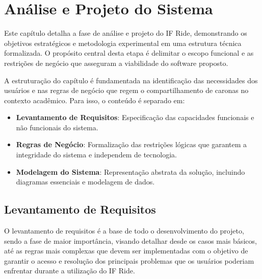 \chapter{Análise e Projeto do Sistema}

Este capítulo detalha a fase de análise e projeto do IF Ride, demonstrando os objetivos estratégicos e metodologia experimental em uma estrutura técnica formalizada. O propósito central desta etapa é delimitar o escopo funcional e as restrições de negócio que asseguram a viabilidade do software proposto.

A estruturação do capítulo é fundamentada na identificação das necessidades dos usuários e nas regras de negócio que regem o compartilhamento de caronas no contexto acadêmico. Para isso, o conteúdo é separado em:

\begin{itemize}
    \item \textbf{Levantamento de Requisitos}: Especificação das capacidades funcionais e não funcionais do sistema.
    \item \textbf{Regras de Negócio}: Formalização das restrições lógicas que garantem a integridade do sistema e independem de tecnologia.
    \item \textbf{Modelagem do Sistema}: Representação abstrata da solução, incluindo diagramas essenciais e modelagem de dados.
\end{itemize}

\section{Levantamento de Requisitos}

O levantamento de requisitos é a base de todo o desenvolvimento do projeto, sendo a fase de maior importância, visando detalhar desde os casos mais básicos, até as regras mais complexas que devem ser implementadas com o objetivo de garantir o acesso e resolução dos principais problemas que os usuários poderiam enfrentar durante a utilização do IF Ride.